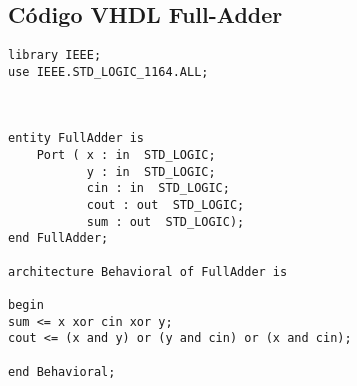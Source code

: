 \documentclass[12pt]{article}
\begin{document}
\subsection{Código VHDL Full-Adder}

\begin{lstlisting}
library IEEE;
use IEEE.STD_LOGIC_1164.ALL;



entity FullAdder is
    Port ( x : in  STD_LOGIC;
           y : in  STD_LOGIC;
           cin : in  STD_LOGIC;
           cout : out  STD_LOGIC;
           sum : out  STD_LOGIC);
end FullAdder;

architecture Behavioral of FullAdder is

begin
sum <= x xor cin xor y;
cout <= (x and y) or (y and cin) or (x and cin);

end Behavioral;
\end{lstlisting}
\end{document}
